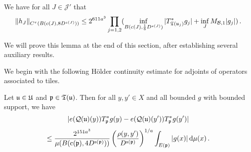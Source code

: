 {    \begin{lemma}
        \label{lem hHölder}
        We have for all $J \in \mathcal{J}'$ that
        \begin{equation}
            \label{hHölder}
            \|h_J\|_{C^{\tau}(B(c(J), 8D^{s(J)}))} \le  2^{611a^3}   \prod_{j = 1,2} (\inf_{B(c(J), \frac{1}{8}D^{s(J)})} |T_{\mathfrak T(\mathfrak u_j)}^* g_j| + \inf_J M_{\mathcal{B}, 1} |g_j|)\,.
        \end{equation}
    \end{lemma}

    We will prove this lemma at the end of this section, after establishing several auxiliary results.

    We begin with the following Hölder continuity estimate for adjoints of operators associated to tiles.
    \begin{lemma}
        \label{lem tile Hölder}
        Let $\mathfrak u \in \mathfrak U$ and $\mathfrak p \in \mathfrak T(\mathfrak u)$.  Then for all $y, y' \in X$ and all bounded $g$ with bounded support, we have
        $$
            |e(\mathcal{Q}(\mathfrak u)(y)) T_{\mathfrak p}^* g(y) - e(\mathcal{Q}(\mathfrak u)(y')) T_{\mathfrak p}^* g(y')|
        $$
        \begin{equation}
            \label{T*Hölder2}
            \le \frac{2^{151a^3}}{\mu(B(\mathrm{c}(\mathfrak p), 4D^{\mathrm{s}(\mathfrak p)}))} \left(\frac{\rho(y, y')}{D^{\mathrm{s}(\mathfrak p)}}\right)^{1/a}  \int_{E(\mathfrak p)} |g(x)| \, \mathrm{d}\mu(x)\,.
        \end{equation}
    \end{lemma}

}
